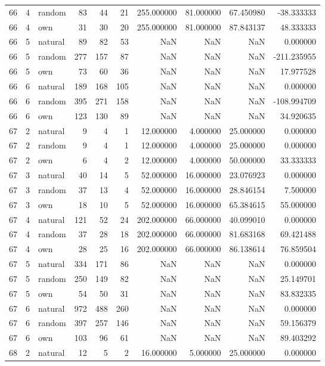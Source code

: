 \begin{table}[htbp]
\begin{tabular}{rrlrrrrrrr}
66 & 4 & random & 83 & 44 & 21 & 255.000000 & 81.000000 & 67.450980 & -38.333333 \\
66 & 4 & own & 31 & 30 & 20 & 255.000000 & 81.000000 & 87.843137 & 48.333333 \\
66 & 5 & natural & 89 & 82 & 53 & NaN & NaN & NaN & 0.000000 \\
66 & 5 & random & 277 & 157 & 87 & NaN & NaN & NaN & -211.235955 \\
66 & 5 & own & 73 & 60 & 36 & NaN & NaN & NaN & 17.977528 \\
66 & 6 & natural & 189 & 168 & 105 & NaN & NaN & NaN & 0.000000 \\
66 & 6 & random & 395 & 271 & 158 & NaN & NaN & NaN & -108.994709 \\
66 & 6 & own & 123 & 130 & 89 & NaN & NaN & NaN & 34.920635 \\
67 & 2 & natural & 9 & 4 & 1 & 12.000000 & 4.000000 & 25.000000 & 0.000000 \\
67 & 2 & random & 9 & 4 & 1 & 12.000000 & 4.000000 & 25.000000 & 0.000000 \\
67 & 2 & own & 6 & 4 & 2 & 12.000000 & 4.000000 & 50.000000 & 33.333333 \\
67 & 3 & natural & 40 & 14 & 5 & 52.000000 & 16.000000 & 23.076923 & 0.000000 \\
67 & 3 & random & 37 & 13 & 4 & 52.000000 & 16.000000 & 28.846154 & 7.500000 \\
67 & 3 & own & 18 & 10 & 5 & 52.000000 & 16.000000 & 65.384615 & 55.000000 \\
67 & 4 & natural & 121 & 52 & 24 & 202.000000 & 66.000000 & 40.099010 & 0.000000 \\
67 & 4 & random & 37 & 28 & 18 & 202.000000 & 66.000000 & 81.683168 & 69.421488 \\
67 & 4 & own & 28 & 25 & 16 & 202.000000 & 66.000000 & 86.138614 & 76.859504 \\
67 & 5 & natural & 334 & 171 & 86 & NaN & NaN & NaN & 0.000000 \\
67 & 5 & random & 250 & 149 & 82 & NaN & NaN & NaN & 25.149701 \\
67 & 5 & own & 54 & 50 & 31 & NaN & NaN & NaN & 83.832335 \\
67 & 6 & natural & 972 & 488 & 260 & NaN & NaN & NaN & 0.000000 \\
67 & 6 & random & 397 & 257 & 146 & NaN & NaN & NaN & 59.156379 \\
67 & 6 & own & 103 & 96 & 61 & NaN & NaN & NaN & 89.403292 \\
68 & 2 & natural & 12 & 5 & 2 & 16.000000 & 5.000000 & 25.000000 & 0.000000 \\

\end{tabular}
\end{table}
